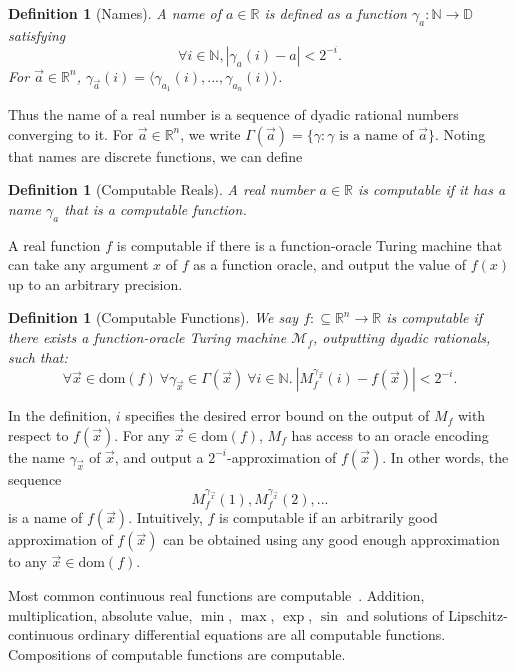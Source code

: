 \documentclass[conference]{IEEEtran}
\newtheorem{definition}[theorem]{Definition}
\newcommand{\dom}{\mathrm{dom}}
\begin{document}
\begin{definition}[Names]
A name of $a\in \mathbb{R}$ is defined as a function $\mathcal{\gamma}_a: \mathbb{N}\rightarrow \mathbb{D}$ satisfying 
$$\forall i\in \mathbb{N}, |\gamma_a(i) - a|<2^{-i}.$$
For $\vec a\in \mathbb{R}^n$, $\gamma_{\vec a}(i) = \langle \gamma_{a_1}(i), ..., \gamma_{a_n}(i)\rangle$.  
\end{definition}
Thus the name of a real number is a sequence of dyadic rational numbers converging to it. For $\vec a\in \mathbb{R}^n$, we write $\Gamma(\vec a) = \{\gamma: \gamma\mbox{ is a name of }\vec a\}$. Noting that names are discrete functions, we can define
\begin{definition}[Computable Reals]
A real number $a\in \mathbb{R}$ is computable if it has a name $\gamma_{a}$ that is a computable function. 
\end{definition}

A real function $f$ is computable if there is a function-oracle Turing machine that can take any argument $x$ of $f$ as a function oracle, and output the value of $f(x)$ up to an arbitrary precision. 

\begin{definition}[Computable Functions]
We say $f:\subseteq\mathbb{R}^n\rightarrow \mathbb{R}$ is computable if there exists a function-oracle Turing machine $\mathcal{M}_f$, outputting dyadic rationals, such that: 
$$\forall \vec x \in \dom(f)\ \forall \gamma_{\vec x}\in \Gamma(\vec x)\ \forall i \in \mathbb{N}.\ |M_f^{\gamma_{\vec x}}(i) - f(\vec x)|<2^{-i}.$$
\end{definition}

In the definition, $i$ specifies the desired error bound on the output of $M_f$ with respect to $f(\vec x)$. For any $\vec x\in \dom(f)$, $M_f$ has access to an oracle encoding the name $\gamma_{\vec x}$ of $\vec x$, and output a $2^{-i}$-approximation of $f(\vec x)$. In other words, the sequence 
$$M_f^{\gamma_{\vec x}}(1), M_f^{\gamma_{\vec x}}(2), ... $$
is a name of $f(\vec x)$. Intuitively, $f$ is computable if an arbitrarily good approximation of $f(\vec x)$ can be obtained using any good enough approximation to any $\vec x\in\dom(f)$.

Most common continuous real functions are computable~\cite{CAbook}. Addition, multiplication, absolute value, $\min$, $\max$, $\exp$, $\sin$ and solutions of Lipschitz-continuous ordinary differential equations are all computable functions. Compositions of computable functions are computable.  
\end{document}
